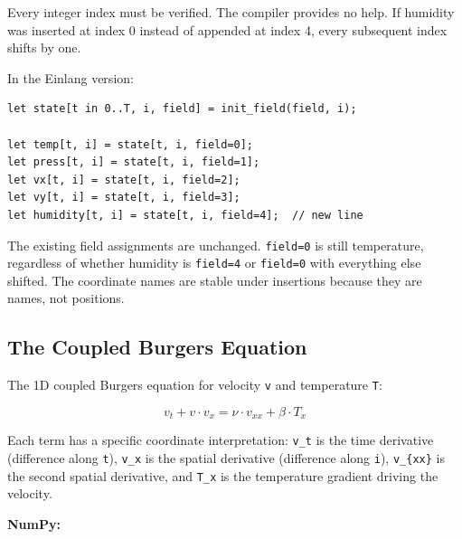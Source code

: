 \documentclass[11pt,titlepage]{article}
\begin{document}
Every integer index must be verified. The compiler provides no help. If
humidity was inserted at index 0 instead of appended at index 4, every
subsequent index shifts by one.

In the Einlang version:

\begin{verbatim}
let state[t in 0..T, i, field] = init_field(field, i);

let temp[t, i] = state[t, i, field=0];
let press[t, i] = state[t, i, field=1];
let vx[t, i] = state[t, i, field=2];
let vy[t, i] = state[t, i, field=3];
let humidity[t, i] = state[t, i, field=4];  // new line
\end{verbatim}

The existing field assignments are unchanged. \texttt{field=0} is still
temperature, regardless of whether humidity is \texttt{field=4} or
\texttt{field=0} with everything else shifted. The coordinate names are
stable under insertions because they are names, not positions.

\vspace{2em}

\hypertarget{the-coupled-burgers-equation}{%
\subsection{The Coupled Burgers
Equation}\label{the-coupled-burgers-equation}}

The 1D coupled Burgers equation for velocity \texttt{v} and temperature
\texttt{T}:

\[v_t + v \cdot v_x = \nu \cdot v_{xx} + \beta \cdot T_x\]

Each term has a specific coordinate interpretation: \texttt{v\_t} is the
time derivative (difference along \texttt{t}), \texttt{v\_x} is the
spatial derivative (difference along \texttt{i}), \texttt{v\_\{xx\}} is
the second spatial derivative, and \texttt{T\_x} is the temperature
gradient driving the velocity.

\textbf{NumPy:}
\end{document}
